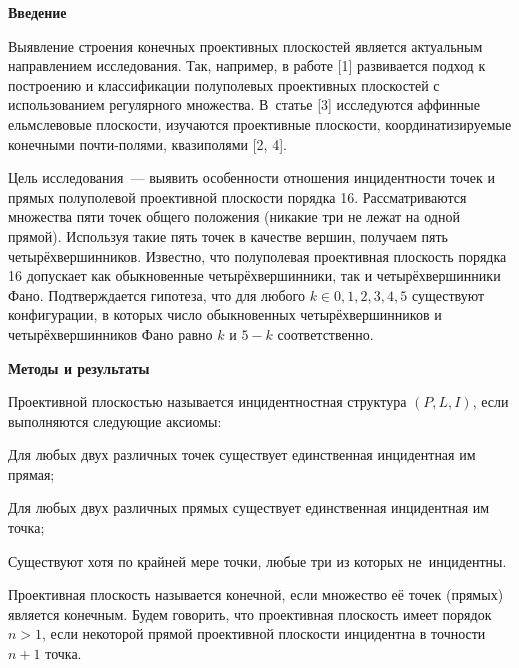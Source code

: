  

\makeProcTitle
{}

\textbf{Введение}

Выявление строения конечных проективных плоскостей является актуальным направлением исследования. Так, например, в работе [1] развивается подход к построению и классификации полуполевых проективных плоскостей с использованием регулярного множества. В~статье [3] исследуются аффинные ельмслевовые плоскости, изучаются проективные плоскости, координатизируемые конечными почти-полями, квазиполями [2, 4].

Цель исследования~--- выявить особенности отношения инцидентности точек и прямых полуполевой проективной плоскости порядка 16. Рассматриваются множества пяти точек общего положения (никакие три не лежат на одной
прямой). Используя такие пять точек в качестве вершин, получаем пять четырёхвершинников. Известно, что полуполевая проективная плоскость порядка 16 допускает как обыкновенные четырёхвершинники, так и четырёхвершинники Фано. Подтверждается гипотеза, что для любого $k \in 0,1,2,3,4,5$ существуют конфигурации, в которых число обыкновенных четырёхвершинников и четырёхвершинников Фано равно $k$ и $5-k$ соответственно.

\textbf{Методы и результаты}

Проективной плоскостью называется инцидентностная структура $(P, L, I)$, если выполняются следующие аксиомы:

\begin{description}[noitemsep]\vspace{-6pt}
\item[А1.] Для любых двух различных точек существует единственная инцидентная им прямая;
\item[А2.] Для любых двух различных прямых существует единственная инцидентная им точка;
\item[А3.] Существуют хотя по крайней мере точки, любые три из которых не~инцидентны.
\end{description}\vspace{-8pt}


Проективная плоскость называется конечной, если множество её точек (прямых) является конечным. Будем говорить, что проективная плоскость имеет порядок $n>1$, если некоторой прямой проективной плоскости инцидентна в точности $n+1$ точка.


